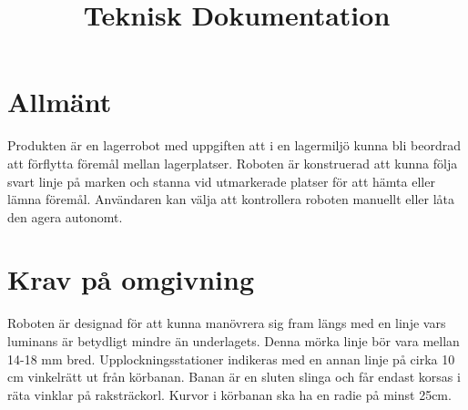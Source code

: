 \documentclass[a4paper,12pt]{article}
\title{Teknisk Dokumentation}
\renewcommand{\thepage}{\roman{page}}
\begin{document}
\LIPStitelsida

\begin{LIPSprojektidentitet}
\end{LIPSprojektidentitet}


\renewcommand*\contentsname{Innehåll}
\begin{spacing}{0.5}
\tableofcontents{}
\end{spacing}
\newpage

\begin{LIPSdokumenthistorik}
\end{LIPSdokumenthistorik}
\newpage

\renewcommand{\thepage}{\arabic{page}}
\setcounter{page}{1}

\section{Allmänt}
Produkten är en lagerrobot med uppgiften att i en lagermiljö kunna bli beordrad att förflytta föremål mellan lagerplatser. Roboten är konstruerad att kunna följa svart linje på marken och stanna vid utmarkerade platser för att hämta eller lämna föremål. Användaren kan välja att kontrollera roboten manuellt eller låta den agera autonomt.

\section{Krav på omgivning}
Roboten är designad för att kunna manövrera sig fram längs med en linje vars luminans är betydligt mindre än underlagets. Denna mörka linje bör vara mellan 14-18 mm bred. Upplockningsstationer indikeras med en annan linje på cirka 10 cm vinkelrätt ut från körbanan. Banan är en sluten slinga och får endast korsas i räta vinklar på raksträckorl. Kurvor i körbanan ska ha en radie på minst 25cm. 
\end{document}

